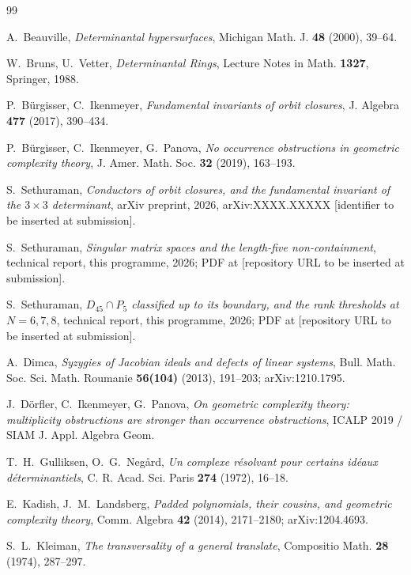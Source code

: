 \documentclass[11pt]{amsart}
\theoremstyle{plain}
\theoremstyle{definition}
\theoremstyle{remark}
\begin{document}
\begin{thebibliography}{99}

 A.~Beauville, \emph{Determinantal hypersurfaces}, Michigan Math.
J. \textbf{48} (2000), 39--64.

 W.~Bruns, U.~Vetter, \emph{Determinantal Rings}, Lecture
Notes in Math. \textbf{1327}, Springer, 1988.

 P.~B\"urgisser, C.~Ikenmeyer, \emph{Fundamental invariants of
orbit closures}, J. Algebra \textbf{477} (2017), 390--434.

 P.~B\"urgisser, C.~Ikenmeyer, G.~Panova, \emph{No occurrence
obstructions in geometric complexity theory}, J. Amer. Math. Soc. \textbf{32}
(2019), 163--193.

 S.~Sethuraman, \emph{Conductors of orbit closures, and the
fundamental invariant of the $3\times 3$ determinant}, arXiv preprint, 2026,
arXiv:XXXX.XXXXX [identifier to be inserted at submission].

 S.~Sethuraman, \emph{Singular matrix spaces and the
length-five non-containment}, technical report, this programme, 2026; PDF at
[repository URL to be inserted at submission].

 S.~Sethuraman, \emph{$D_{45}\cap P_5$ classified up to its
boundary, and the rank thresholds at $N=6,7,8$}, technical report, this programme,
2026; PDF at [repository URL to be inserted at submission].

 A.~Dimca, \emph{Syzygies of Jacobian ideals and defects of
linear systems}, Bull. Math. Soc. Sci. Math. Roumanie \textbf{56(104)} (2013),
191--203; arXiv:1210.1795.

 J.~D\"orfler, C.~Ikenmeyer, G.~Panova, \emph{On geometric
complexity theory: multiplicity obstructions are stronger than occurrence
obstructions}, ICALP 2019 / SIAM J. Appl. Algebra Geom.

 T.~H.~Gulliksen, O.~G.~Neg\aa rd, \emph{Un complexe r\'esolvant
pour certains id\'eaux d\'eterminantiels}, C. R. Acad. Sci. Paris \textbf{274}
(1972), 16--18.

 E.~Kadish, J.~M.~Landsberg, \emph{Padded polynomials, their
cousins, and geometric complexity theory}, Comm. Algebra \textbf{42} (2014),
2171--2180; arXiv:1204.4693.

 S.~L.~Kleiman, \emph{The transversality of a general
translate}, Compositio Math. \textbf{28} (1974), 287--297.


\end{thebibliography}
\end{document}
